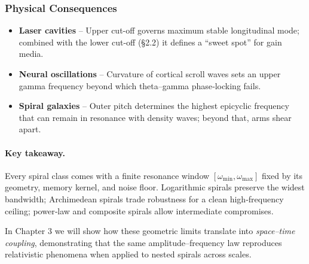 \subsubsection{Physical Consequences}

\begin{itemize}
  \item \textbf{Laser cavities} – Upper cut-off governs maximum stable longitudinal mode; combined with the lower cut-off (§2.2) it defines a “sweet spot” for gain media.
  \item \textbf{Neural oscillations} – Curvature of cortical scroll waves sets an upper gamma frequency beyond which theta–gamma phase‐locking fails.
  \item \textbf{Spiral galaxies} – Outer pitch determines the highest epicyclic frequency that can remain in resonance with density waves; beyond that, arms shear apart.
\end{itemize}

\paragraph{Key takeaway.}  
Every spiral class comes with a finite resonance window \([\omega_{\min},\omega_{\max}]\) fixed by its geometry, memory kernel, and noise floor.  Logarithmic spirals preserve the widest bandwidth; Archimedean spirals trade robustness for a clean high‐frequency ceiling; power‐law and composite spirals allow intermediate compromises.



In Chapter 3 we will show how these geometric limits translate into \emph{space–time coupling}, demonstrating that the same amplitude–frequency law reproduces relativistic phenomena when applied to nested spirals across scales.  


